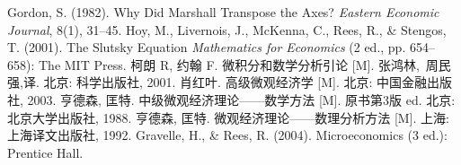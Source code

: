 \begin{thebibliography}{99}
 Gordon, S. (1982). Why Did Marshall Transpose the Axes? {\it Eastern Economic Journal}, 8(1), 31--45.
 Hoy, M., Livernois, J., McKenna, C., Rees, R., \& Stengos, T. (2001). The Slutsky Equation \emph{Mathematics for Economics} (2 ed., pp. 654--658): The MIT Press.
 柯朗 R, 约翰 F. {\kaishu 微积分和数学分析引论} [M]. 张鸿林,~周民强,译. 北京: 科学出版社, 2001.
 肖红叶. {\kaishu 高级微观经济学} [M]. 北京: 中国金融出版社, 2003.
 亨德森, 匡特. {\kaishu 中级微观经济理论——数学方法} [M]. 原书第3版 ed. 北京: 北京大学出版社, 1988.
 亨德森, 匡特. {\kaishu 微观经济理论——数理分析方法} [M]. 上海: 上海译文出版社, 1992.
 Gravelle, H., \& Rees, R. (2004). Microeconomics (3 ed.): Prentice Hall.
\end{thebibliography}